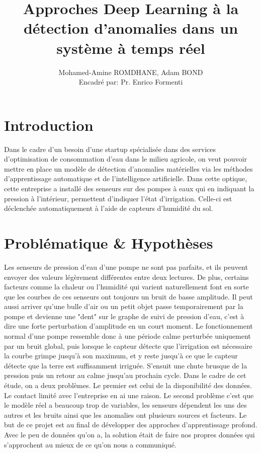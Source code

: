 \documentclass[french]{article}
\title{Approches Deep Learning à la détection d'anomalies dans un système à temps réel}
\author{Mohamed-Amine ROMDHANE, Adam BOND\\Encadré par: Pr. Enrico Formenti}
\date{}
\theoremstyle{mytheoremstyle}
\theoremstyle{mytheoremstyle}
\theoremstyle{myproblemstyle}
\begin{document}
    \maketitle

    \tableofcontents
    \clearpage

    \section{Introduction}
    Dans le cadre d'un besoin d'une startup spécialisée dans des services d'optimisation de consommation d'eau dans le milieu agricole, on veut pouvoir mettre en place un modèle de détection d'anomalies matérielles via les méthodes d'apprentissage automatique et de l'intelligence artificielle. Dans cette optique, cette entreprise a installé des senseurs sur des pompes à eaux qui en indiquant la pression à l'intérieur, permettent d'indiquer l'état d'irrigation. Celle-ci est déclenchée automatiquement à l'aide de capteurs d'humidité du sol.     
    \section{Problématique \& Hypothèses}
    Les senseurs de pression d'eau d'une pompe ne sont pas parfaits, et ils peuvent envoyer des valeurs légèrement différentes entre deux lectures. De plus, certains facteurs comme la chaleur ou l'humidité qui varient naturellement font en sorte que les courbes de ces senseurs ont toujours un bruit de basse amplitude. Il peut aussi arriver qu'une bulle d'air ou un petit objet passe temporairement par la pompe et devienne une "dent" sur le graphe de suivi de pression d'eau, c'est à dire une forte perturbation d'amplitude en un court moment.
    \newline
    \indent Le fonctionnement normal d'une pompe ressemble donc à une période calme perturbée uniquement par un bruit global, puis lorsque le capteur détecte que l'irrigation est nécessaire la courbe grimpe jusqu'à son maximum, et y reste jusqu'à ce que le capteur détecte que la terre est suffisamment irriguée. S'ensuit une chute brusque de la pression puis un retour au calme jusqu'au prochain cycle.
    \newline
    \indent Dans le cadre de cet étude, on a deux problèmes. Le premier est celui de la disponibilité des données. Le contact limité avec l'entreprise en ai une raison. Le second problème c'est que le modèle réel a beaucoup trop de variables, les senseurs dépendent les uns des autres et les bruits ainsi que les anomalies ont plusieurs sources et facteurs. 
    \newline
    \indent Le but de ce projet est au final de développer des approches d'apprentissage profond. Avec le peu de données qu'on a, la solution était de faire nos propres données qui s'approchent au mieux de ce qu'on nous a communiqué.
\end{document}
